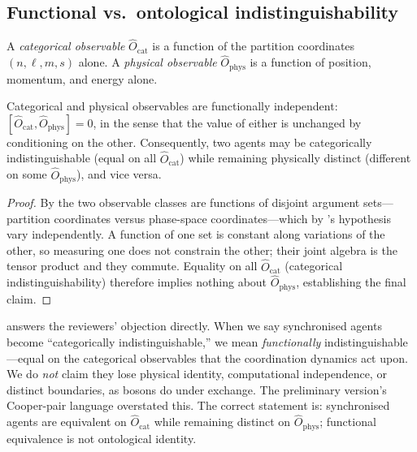 \documentclass[11pt,twocolumn,a4paper]{article}
\begin{document}
\subsection{Functional vs.\ ontological indistinguishability}

\begin{definition}\label{def:observables}
A \emph{categorical observable} $\hat O_{\mathrm{cat}}$ is a function of the
partition coordinates $(n,\ell,m,s)$ alone. A \emph{physical observable}
$\hat O_{\mathrm{phys}}$ is a function of position, momentum, and energy alone.
\end{definition}

\begin{theorem}\label{thm:commutation}
Categorical and physical observables are functionally independent:
$[\hat O_{\mathrm{cat}},\hat O_{\mathrm{phys}}]=0$, in the sense that the value
of either is unchanged by conditioning on the other. Consequently, two agents
may be categorically indistinguishable (equal on all $\hat O_{\mathrm{cat}}$)
while remaining physically distinct (different on some $\hat O_{\mathrm{phys}}$),
and vice versa.
\end{theorem}

\begin{proof}
By  the two observable classes are functions of disjoint
argument sets---partition coordinates versus phase-space coordinates---which by
's hypothesis vary independently. A function of one set is
constant along variations of the other, so measuring one does not constrain the
other; their joint algebra is the tensor product and they commute. Equality on
all $\hat O_{\mathrm{cat}}$ (categorical indistinguishability) therefore implies
nothing about $\hat O_{\mathrm{phys}}$, establishing the final claim.
\end{proof}

\begin{remark}\label{rem:functional-ontological}
 answers the reviewers' objection directly. When we say
synchronised agents become ``categorically indistinguishable,'' we mean
\emph{functionally} indistinguishable---equal on the categorical observables
that the coordination dynamics act upon. We do \emph{not} claim they lose
physical identity, computational independence, or distinct boundaries, as
bosons do under exchange. The preliminary version's Cooper-pair language
overstated this. The correct statement is: synchronised agents are equivalent
on $\hat O_{\mathrm{cat}}$ while remaining distinct on $\hat O_{\mathrm{phys}}$;
functional equivalence is not ontological identity.
\end{remark}
\end{document}
